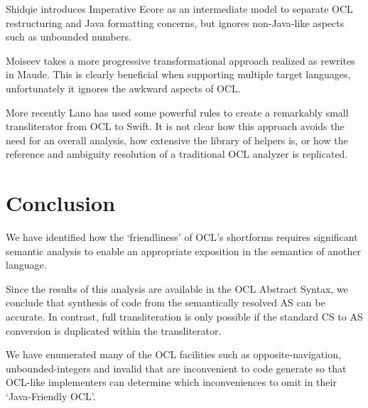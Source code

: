 \documentclass[sigconf]{acmart}
\begin{document}
Shidqie\cite{Shidqie} introduces Imperative Ecore as an intermediate model to separate OCL restructuring and Java formatting concerns, but ignores non-Java-like aspects such as unbounded numbers.

Moiseev\cite{rodion-models2009} takes a more progressive transformational approach realized as rewrites in Maude. This is clearly beneficial when supporting multiple target languages, unfortunately it ignores the awkward aspects of OCL.


More recently Lano\cite{Lano2021} has used some powerful rules to create a remarkably small transliterator from OCL to Swift. It is not clear how this approach avoids the need for an overall analysis, how extensive the library of helpers is, or how the reference and ambiguity resolution of a traditional OCL analyzer is replicated. 

\section{Conclusion}\label{Conclusion}

We have identified how the `friendliness' of OCL's shortforms requires significant semantic analysis to enable an appropriate exposition in the semantics of another language.

Since the results of this analysis are available in the OCL Abstract Syntax, we conclude that synthesis of code from the semantically resolved AS can be accurate. In contrast, full transliteration is only possible if the standard CS to AS conversion is duplicated within the transliterator.

We have enumerated many of the OCL facilities such as opposite-navigation, unbounded-integers and invalid that are inconvenient to code generate so that OCL-like implementers can determine which inconveniences to omit in their `Java-Friendly OCL'.



\end{document}
